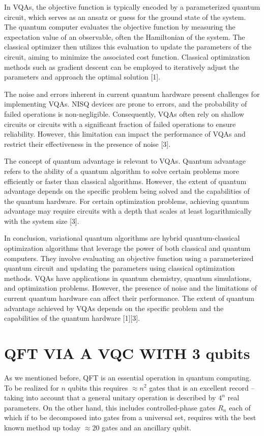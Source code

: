 \documentclass[inscr,ack,preface]{diphdthesis}
\begin{document}
In VQAs, the objective function is typically encoded by a parameterized quantum circuit, which serves as an ansatz or guess for the ground state of the system. The quantum computer evaluates the objective function by measuring the expectation value of an observable, often the Hamiltonian of the system. The classical optimizer then utilizes this evaluation to update the parameters of the circuit, aiming to minimize the associated cost function. Classical optimization methods such as gradient descent can be employed to iteratively adjust the parameters and approach the optimal solution [1].

The noise and errors inherent in current quantum hardware present challenges for implementing VQAs. NISQ devices are prone to errors, and the probability of failed operations is non-negligible. Consequently, VQAs often rely on shallow circuits or circuits with a significant fraction of failed operations to ensure reliability. However, this limitation can impact the performance of VQAs and restrict their effectiveness in the presence of noise [3].

The concept of quantum advantage is relevant to VQAs. Quantum advantage refers to the ability of a quantum algorithm to solve certain problems more efficiently or faster than classical algorithms. However, the extent of quantum advantage depends on the specific problem being solved and the capabilities of the quantum hardware. For certain optimization problems, achieving quantum advantage may require circuits with a depth that scales at least logarithmically with the system size [3].

In conclusion, variational quantum algorithms are hybrid quantum-classical optimization algorithms that leverage the power of both classical and quantum computers. They involve evaluating an objective function using a parameterized quantum circuit and updating the parameters using classical optimization methods. VQAs have applications in quantum chemistry, quantum simulations, and optimization problems. However, the presence of noise and the limitations of current quantum hardware can affect their performance. The extent of quantum advantage achieved by VQAs depends on the specific problem and the capabilities of the quantum hardware [1][3].


\chapter{ QFT VIA A  VQC WITH 3 qubits}

As we mentioned before, QFT is an essential operation in quantum computing. To be realized for $n$ qubits this requires 
$\approx n^2$ gates that is an excellent record --taking into account that a general unitary operation
is described by $4^n$ real parameters. On the other hand, this includes controlled-phase gates $R_n$
each of which if to be decomposed into gates from a universal set, requires with the best known
method up today $\approx 20$ gates and an ancillary qubit. 
\end{document}
